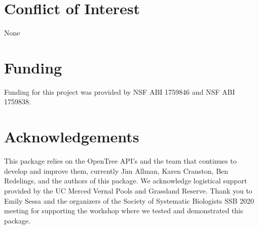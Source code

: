 \documentclass[oupdraft]{sysbio_sse}
\begin{document}
\section{Conflict of Interest}
None

\section{Funding}
Funding for this project was provided by NSF ABI 1759846 and NSF ABI 1759838.

\section{Acknowledgements}
This package relies on the OpenTree API's and the team that continues to develop and improve them, currently Jim Allman, Karen Cranston, Ben Redelings, and the authors of this package. We acknowledge logistical support provided by the UC Merced Vernal Pools and Grassland Reserve.
Thank you to Emily Sessa and the organizers of the Society of Systematic Biologists SSB 2020 meeting for supporting the workshop where we tested and demonstrated this package.


\bigskip\bigskip








\end{document}
